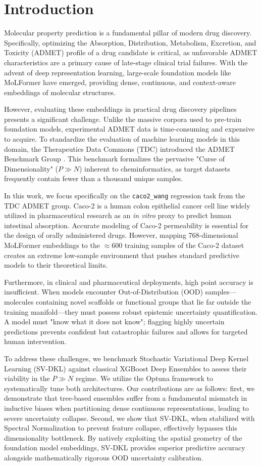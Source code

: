 \section{Introduction}
Molecular property prediction is a fundamental pillar of modern drug discovery. Specifically, optimizing the Absorption, Distribution, Metabolism, Excretion, and Toxicity (ADMET) profile of a drug candidate is critical, as unfavorable ADMET characteristics are a primary cause of late-stage clinical trial failures. With the advent of deep representation learning, large-scale foundation models like MoLFormer \cite{ross2022large} have emerged, providing dense, continuous, and context-aware embeddings of molecular structures. 

However, evaluating these embeddings in practical drug discovery pipelines presents a significant challenge. Unlike the massive corpora used to pre-train foundation models, experimental ADMET data is time-consuming and expensive to acquire. To standardize the evaluation of machine learning models in this domain, the Therapeutics Data Commons (TDC) introduced the ADMET Benchmark Group \cite{huang2021therapeutics}. This benchmark formalizes the pervasive "Curse of Dimensionality" ($P \gg N$) inherent to cheminformatics, as target datasets frequently contain fewer than a thousand unique samples.

In this work, we focus specifically on the \texttt{caco2\_wang} regression task from the TDC ADMET group. Caco-2 is a human colon epithelial cancer cell line widely utilized in pharmaceutical research as an \textit{in vitro} proxy to predict human intestinal absorption. Accurate modeling of Caco-2 permeability is essential for the design of orally administered drugs. However, mapping 768-dimensional MoLFormer embeddings to the $\approx 600$ training samples of the Caco-2 dataset creates an extreme low-sample environment that pushes standard predictive models to their theoretical limits.

Furthermore, in clinical and pharmaceutical deployments, high point accuracy is insufficient. When models encounter Out-of-Distribution (OOD) samples—molecules containing novel scaffolds or functional groups that lie far outside the training manifold—they must possess robust epistemic uncertainty quantification. A model must "know what it does not know"; flagging highly uncertain predictions prevents confident but catastrophic failures and allows for targeted human intervention. 

To address these challenges, we benchmark Stochastic Variational Deep Kernel Learning (SV-DKL) against classical XGBoost Deep Ensembles to assess their viability in the $P \gg N$ regime. We utilize the Optuna framework to systematically tune both architectures. Our contributions are as follows: first, we demonstrate that tree-based ensembles suffer from a fundamental mismatch in inductive biases when partitioning dense continuous representations, leading to severe uncertainty collapse. Second, we show that SV-DKL, when stabilized with Spectral Normalization to prevent feature collapse, effectively bypasses this dimensionality bottleneck. By natively exploiting the spatial geometry of the foundation model embeddings, SV-DKL provides superior predictive accuracy alongside mathematically rigorous OOD uncertainty calibration.
